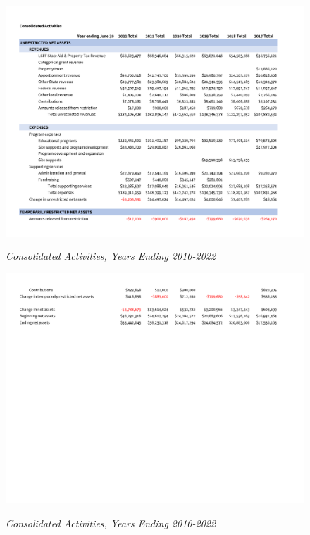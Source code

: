 \begin{figure}[hbt]
    \caption[Consolidated Financial Position, Years Ending 2010–2022]{\textit{Consolidated Activities, Years Ending 2010-2022}}\label{fig:consolidated_activities_2010-2022-1} %
    \includegraphics[width=\textwidth]{Consolidated Financial Statements/v5 Spreadsheets/Consolidated_Activities_Years_2010-2022 PDF pages/.pg_0001}\\ %
\end{figure}
\begin{figure}[hbt]
    \caption[Consolidated Activities, Years Ending 2010–2022]{\textit{Consolidated Activities, Years Ending 2010-2022}}\label{fig:consolidated_activities_2010-2022-2} %
    \includegraphics[width=\textwidth]{Consolidated Financial Statements/v5 Spreadsheets/Consolidated_Activities_Years_2010-2022 PDF pages/.pg_0002}\\ %
\end{figure}

